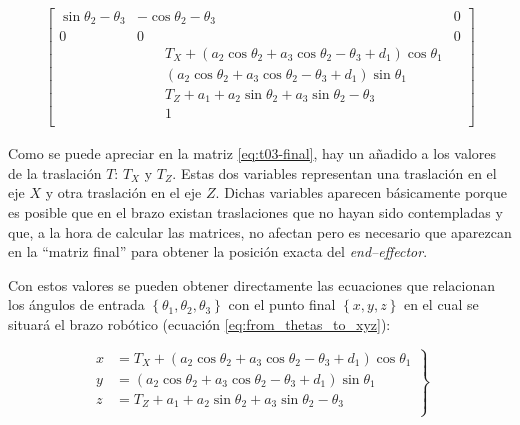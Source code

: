 \begin{align}
{\begin{bmatrix}
        \sin{\theta_{2} - \theta_{3}}                  & - \cos{\theta_{2} - \theta_{3}}                                                                                   & 0                  \\
        0                                              & 0                                                                                                                 & 0                  \\
                                                       & \qquad T_{X} + \left(a_{2} \cos{\theta_{2}} + a_{3} \cos{\theta_{2} - \theta_{3}} + d_{1}\right) \cos{\theta_{1}}                      \\
                                                       & \qquad \left(a_{2} \cos{\theta_{2}} + a_{3} \cos{\theta_{2} - \theta_{3}} + d_{1}\right) \sin{\theta_{1}}                              \\
                                                       & \qquad T_{Z} + a_{1} + a_{2} \sin{\theta_{2}} + a_{3} \sin{\theta_{2} - \theta_{3}}                                                    \\
                                                       & \qquad 1                                                                                                                               \\
    \end{bmatrix}}\label{eq:t03-final}
\end{align}

Como se puede apreciar en la matriz \ref{eq:t03-final}, hay un añadido a los valores
de la traslación $T$: $T_X$ y $T_Z$. Estas dos variables representan una traslación en el
eje $X$ y otra traslación en el eje $Z$. Dichas variables aparecen básicamente
porque es posible que en el brazo existan traslaciones que no hayan sido contempladas
y que, a la hora de calcular las matrices, no afectan pero es necesario que aparezcan
en la ``matriz final'' para obtener la posición exacta del \textit{end--effector}.

Con estos valores se pueden obtener directamente las ecuaciones que relacionan
los ángulos de entrada $\left\{\theta_1, \theta_2, \theta_3\right\}$ con el punto
final $\left\{x, y, z\right\}$ en el cual se situará el brazo robótico (ecuación
\ref{eq:from_thetas_to_xyz}):

\begin{equation}
    \label{eq:from_thetas_to_xyz}
    \left.\begin{aligned}
        x & = T_{X} + \left(a_{2} \cos{\theta_{2}} + a_{3} \cos{\theta_{2} - \theta_{3}} + d_{1}\right) \cos{\theta_{1}} \\
        y & = \left(a_{2} \cos{\theta_{2}} + a_{3} \cos{\theta_{2} - \theta_{3}} + d_{1}\right) \sin{\theta_{1}}         \\
        z & = T_{Z} + a_{1} + a_{2} \sin{\theta_{2}} + a_{3} \sin{\theta_{2} - \theta_{3}}                               \\
    \end{aligned}
    \right\}
\end{equation}

